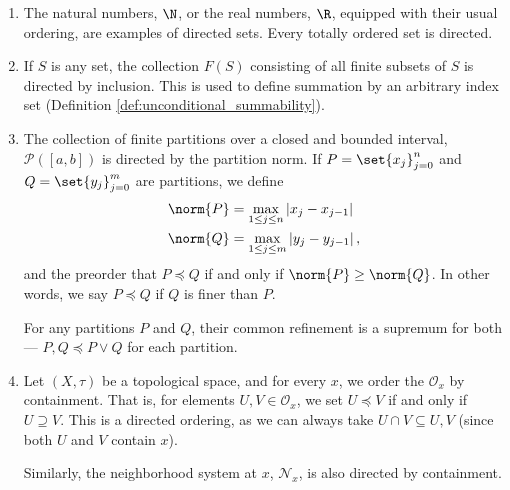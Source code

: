 \begin{example}\hfill
  \begin{enumerate}[(1)]
    \item The natural numbers, $\N$, or the real numbers, $\R$, equipped with their usual ordering, are examples of directed sets. Every totally ordered set is directed.
    \item If $S$ is any set, the collection $F(S)$ consisting of all finite subsets of $S$ is directed by inclusion. This is used to define summation by an arbitrary index set (Definition \ref{def:unconditional_summability}).
    \item The collection of finite partitions over a closed and bounded interval, $\mathcal{P}\left(\left[a,b\right]\right)$ is directed by the partition norm. If $P = \set{x_j}_{j=0}^{n}$ and $Q=\set{y_j}_{j=0}^{m}$ are partitions, we define
      \begin{align*}
        \norm{P} &= \max_{1\leq j\leq n}\left\vert x_j-x_{j-1} \right\vert\\
        \norm{Q} &= \max_{1\leq j \leq m}\left\vert y_{j} - y_{j-1} \right\vert,
      \end{align*}
      and the preorder that $P \preceq Q$ if and only if $\norm{P} \geq \norm{Q}$. In other words, we say $P\preceq Q$ if $Q$ is finer than $P$.\newline

      For any partitions $P$ and $Q$, their common refinement is a supremum for both --- $P,Q\preceq P\vee Q$ for each partition.
    \item Let $\left(X,\tau\right)$ be a topological space, and for every $x$, we order the $\mathcal{O}_{x}$ by containment. That is, for elements $U,V\in \mathcal{O}_{x}$, we set $U\preceq V$ if and only if $U\supseteq V$. This is a directed ordering, as we can always take $U\cap V \subseteq U,V$ (since both $U$ and $V$ contain $x$).\newline

      Similarly, the neighborhood system at $x$, $\mathcal{N}_x$, is also directed by containment.
  \end{enumerate}
\end{example}
